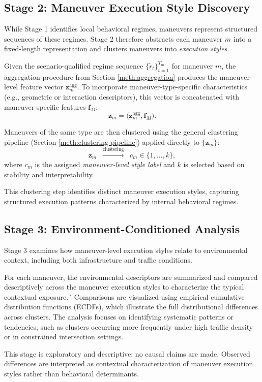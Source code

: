 \subsection{Stage 2: Maneuver Execution Style Discovery}
\label{meth:level2}

While Stage 1 identifies local behavioral regimes, maneuvers represent structured sequences of these regimes. Stage 2 therefore abstracts each maneuver $m$ into a fixed-length representation and clusters maneuvers into \emph{execution styles}.

Given the scenario-qualified regime sequence $\{\tilde r_t\}_{t=1}^{T_m}$ for maneuver $m$, the aggregation procedure from Section \ref{meth:aggregation} produces the maneuver-level feature vector $\mathbf{z}_m^\text{agg}$.
To incorporate maneuver-type-specific characteristics (e.g., geometric or interaction descriptors), this vector is concatenated with maneuver-specific features $\mathbf{f}_M$:
\[
\mathbf{z}_m = \big(\mathbf{z}_m^\text{agg}, \mathbf{f}_M \big).
\]

Maneuvers of the same type are then clustered using the general clustering pipeline (Section \ref{meth:clustering-pipeline}) applied directly to $\{\mathbf{z}_m\}$:
\[
\mathbf{z}_m \;\;\xrightarrow{\text{clustering}}\;\; c_m \in \{1, \dots, k\},
\]
where $c_m$ is the assigned \emph{maneuver-level style label} and $k$ is selected based on stability and interpretability.

This clustering step identifies distinct maneuver execution styles, capturing structured execution patterns characterized by internal behavioral regimes.



\subsection{Stage 3: Environment-Conditioned Analysis}
Stage 3 examines how maneuver-level execution styles relate to environmental context, including both infrastructure and traffic conditions. 

For each maneuver, the environmental descriptors are summarized and compared descriptively across the maneuver execution styles to characterize the typical contextual exposure.´
Comparisons are visualized using empirical cumulative distribution functions (ECDFs), which illustrate the full distributional differences across clusters. The analysis focuses on identifying systematic patterns or tendencies, such as clusters occurring more frequently under high traffic density or in constrained intersection settings.

This stage is exploratory and descriptive; no causal claims are made. Observed differences are interpreted as contextual characterization of maneuver execution styles rather than behavioral determinants.

